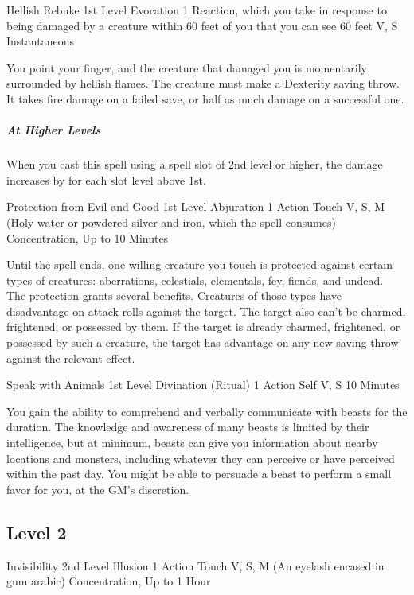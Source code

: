 \documentclass[letterpaper,openany,oneside,twocolumn]{book}
\begin{document}
\DndSpellHeader
  {Hellish Rebuke}
  {1st Level Evocation}
  {1 Reaction, which you take in response to being damaged by a creature within 60 feet of you that you can see}
  {60 feet}
  {V, S}
  {Instantaneous}

You point your finger, and the creature that damaged you is momentarily surrounded by hellish flames. The creature must make a Dexterity saving throw. It takes  fire damage on a failed save, or half as much damage on a successful one.

\subparagraph*{At Higher Levels} When you cast this spell using a spell slot of 2nd level or higher, the damage increases by  for each slot level above 1st.

\DndSpellHeader
  {Protection from Evil and Good}
  {1st Level Abjuration}
  {1 Action}
  {Touch}
  {V, S, M (Holy water or powdered silver and iron, which the spell consumes)}
  {Concentration, Up to 10 Minutes}
  
Until the spell ends, one willing creature you touch is protected against certain types of creatures: aberrations, celestials, elementals, fey, fiends, and undead.\\
The protection grants several benefits. Creatures of those types have disadvantage on attack rolls against the target. The target also can't be charmed, frightened, or possessed by them. If the target is already charmed, frightened, or possessed by such a creature, the target has advantage on any new saving throw against the relevant effect.

\DndSpellHeader
  {Speak with Animals}
  {1st Level Divination (Ritual)}
  {1 Action}
  {Self}
  {V, S}
  {10 Minutes}
  
You gain the ability to comprehend and verbally communicate with beasts for the duration. The knowledge and awareness of many beasts is limited by their intelligence, but at minimum, beasts can give you information about nearby locations and monsters, including whatever they can perceive or have perceived within the past day. You might be able to persuade a beast to perform a small favor for you, at the GM's discretion.

\subsection*{Level 2}

\DndSpellHeader
  {Invisibility}
  {2nd Level Illusion}
  {1 Action}
  {Touch}
  {V, S, M (An eyelash encased in gum arabic)}
  {Concentration, Up to 1 Hour}
  
\end{document}
